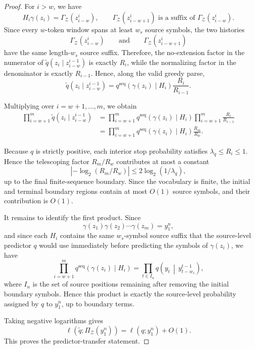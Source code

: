 \documentclass{article}
\theoremstyle{plain}
\theoremstyle{definition}
\theoremstyle{remark}
\begin{document}
\begin{proof}
    For \(i>w\), we have
    \[
        H_i\gamma(z_i)
        =
        \Gamma_{\mathcal Z}(z_{i-w}^{i}),
        \qquad
        \Gamma_{\mathcal Z}(z_{i-w+1}^{i})
        \text{ is a suffix of }
        \Gamma_{\mathcal Z}(z_{i-w}^{i}).
    \]
    Since every \(w\)-token window spans at least \(w_s\) source symbols, the two
    histories
    \[
        \Gamma_{\mathcal Z}(z_{i-w}^{i})
        \qquad\text{and}\qquad
        \Gamma_{\mathcal Z}(z_{i-w+1}^{i})
    \]
    have the same length-\(w_s\) source suffix. Therefore, the no-extension factor
    in the numerator of \(\tilde q(z_i\mid z_{i-w}^{i-1})\) is exactly \(R_i\),
    while the normalizing factor in the denominator is exactly \(R_{i-1}\). Hence,
    along the valid greedy parse,
    \[
        \tilde q(z_i\mid z_{i-w}^{i-1})
        =
        q^{\mathrm{seq}}\!\left(\gamma(z_i)\mid H_i\right)
        \frac{R_i}{R_{i-1}} .
    \]
    
    Multiplying over \(i=w+1,\ldots,m\), we obtain
    \begin{align*}
    \prod_{i=w+1}^{m}
        \tilde q(z_i\mid z_{i-w}^{i-1})
    &=
    \prod_{i=w+1}^{m}
        q^{\mathrm{seq}}\!\left(\gamma(z_i)\mid H_i\right)
        \prod_{i=w+1}^{m}
        \frac{R_i}{R_{i-1}} \\
    &=
    \prod_{i=w+1}^{m}
        q^{\mathrm{seq}}\!\left(\gamma(z_i)\mid H_i\right)
        \frac{R_m}{R_w}.
    \end{align*}
    
    
    Because $q$ is strictly positive, each interior stop probability satisfies
    $\lambda_q\le R_i\le 1$. Hence the telescoping factor $R_m/R_w$ contributes at
    most a constant
    \[
        \left|-\log_2(R_m/R_w)\right|
        \le
        2\log_2(1/\lambda_q),
    \]
    up to the final finite-sequence boundary. Since the vocabulary is finite, the
    initial and terminal boundary regions contain at most $O(1)$
    source symbols, and their contribution is
    $O(1)$.
    
    
    
    It remains to identify the first product. Since
    \[
        \gamma(z_1)\gamma(z_2)\cdots\gamma(z_m)=y_1^n,
    \]
    and since each \(H_i\) contains the same \(w_s\)-symbol source suffix that the
    source-level predictor \(q\) would use immediately before predicting the
    symbols of \(\gamma(z_i)\), we have
    \[
        \prod_{i=w+1}^{m}
        q^{\mathrm{seq}}\!\left(\gamma(z_i)\mid H_i\right)
        =
        \prod_{t\in I_n}
        q\!\left(
            y_t
            \,\middle|\,
            y_{t-w_s}^{t-1}
        \right),
    \]
    where \(I_n\) is the set of source positions remaining after removing the
    initial boundary symbols. Hence this product is exactly the source-level
    probability assigned by \(q\) to \(y_1^n\), up to boundary terms.
    
    Taking negative logarithms gives
    \[
        \ell\!\left(\tilde q;\Pi_{\mathcal Z}(y_1^n)\right)
        =
        \ell(q;y_1^n)
        +
        O(1).
    \]
    This proves the predictor-transfer statement.
    \end{proof}
    
\end{document}

